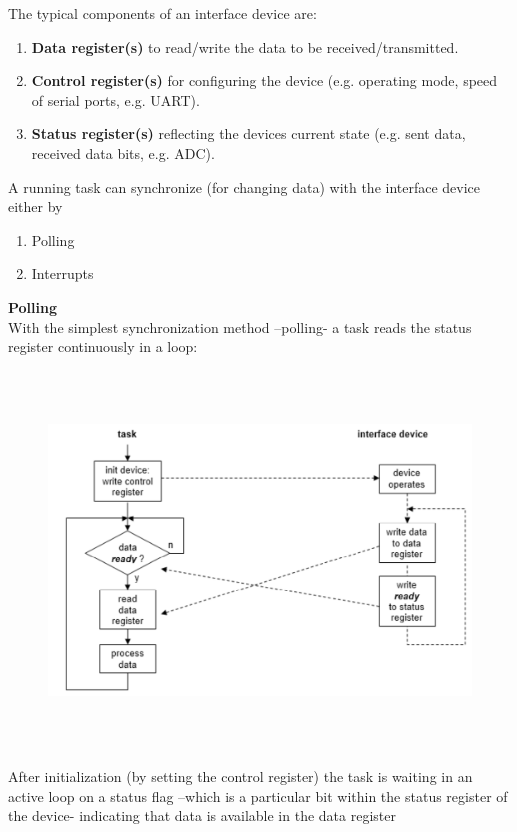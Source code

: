 The typical components of an interface device are:

\begin{enumerate}
	\item  \textbf{Data register(s)} to read/write the data to be received/transmitted.
	\item  \textbf{Control register(s)} for configuring the device (e.g. operating mode, speed of serial ports, e.g. UART).
	\item  \textbf{Status register(s)} reflecting the devices current state (e.g. sent data, received data bits, e.g. ADC).
\end{enumerate}

A running task can synchronize  (for changing data) with the interface device either by

\begin{enumerate}
	\item  Polling
	\item  Interrupts
\end{enumerate}

{\rot\bf Polling}\\

With the simplest synchronization method --polling- a task reads the status register continuously in a loop:

 	\begin{figure}[h]
    \centering
    \includegraphics[width=14cm, height=10cm]{Images/image123.png}
    \label{fig:Fig 72}
    \end{figure}

After initialization (by setting the control register) the task is waiting in an active loop on a status flag --which is a particular bit within the status register of the device- indicating that  data is available in the data register  

